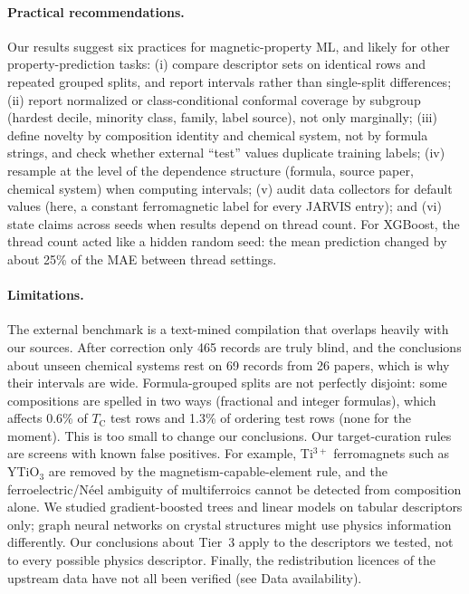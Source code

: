 \documentclass[pdflatex,sn-nature]{sn-jnl}
\newcommand{\Tc}{\ensuremath{T_\mathrm{C}}}
\begin{document}
\paragraph{Practical recommendations.} Our results suggest six practices for magnetic-property ML, and likely for other property-prediction tasks:
(i) compare descriptor sets on identical rows and repeated grouped splits, and report intervals rather than single-split differences;
(ii) report normalized or class-conditional conformal coverage by subgroup (hardest decile, minority class, family, label source), not only marginally;
(iii) define novelty by composition identity and chemical system, not by formula strings, and check whether external ``test'' values duplicate training labels;
(iv) resample at the level of the dependence structure (formula, source paper, chemical system) when computing intervals;
(v) audit data collectors for default values (here, a constant ferromagnetic label for every JARVIS entry); and
(vi) state claims across seeds when results depend on thread count. For XGBoost, the thread count acted like a hidden random seed: the mean prediction changed by about 25\% of the MAE between thread settings.

\paragraph{Limitations.} The external benchmark is a text-mined compilation that overlaps heavily with our sources. After correction only 465 records are truly blind, and the conclusions about unseen chemical systems rest on 69 records from 26 papers, which is why their intervals are wide. Formula-grouped splits are not perfectly disjoint: some compositions are spelled in two ways (fractional and integer formulas), which affects 0.6\% of \Tc{} test rows and 1.3\% of ordering test rows (none for the moment). This is too small to change our conclusions. Our target-curation rules are screens with known false positives. For example, Ti$^{3+}$ ferromagnets such as YTiO$_3$ are removed by the magnetism-capable-element rule, and the ferroelectric/N\'eel ambiguity of multiferroics cannot be detected from composition alone. We studied gradient-boosted trees and linear models on tabular descriptors only; graph neural networks on crystal structures might use physics information differently. Our conclusions about Tier~3 apply to the descriptors we tested, not to every possible physics descriptor. Finally, the redistribution licences of the upstream data have not all been verified (see Data availability).
\end{document}
